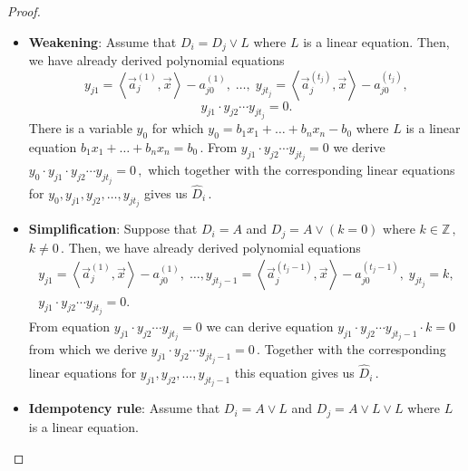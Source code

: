 \documentclass[11pt]{article}
\newcommand{\Z}{{\mathbb Z}}
\begin{document}
\begin{proof}
\begin{itemize}
 Then there is an equation $y_{i} = L_i$ from the set  $\{y_1 = L_1, y_2 = L_2, \ldots, y_t = L_t\}$ for which %
    $$
    L_{i} = \alpha \left(\left\langle \vec a_j^{(1)}, \vec x \right \rangle - a_{j 0}^{(1)}\right) + \beta \left(\left\langle \vec a_k^{(1)}, \vec x \right \rangle - a_{k 0}^{(1)}\right).
    $$
    Then we derive $y_{i} = \alpha y_{j 1} + \beta y_{k 1}$ and %
$y_{i} \cdot y_{j 2} \cdots y_{j t_j} \cdot y_{k 2} \cdots y_{k t_k} = 0\,,$ %
 which together with the corresponding linear equations for  $y_{i}, y_{j 2}, \ldots, y_{j t_j}, y_{k 2}, \ldots, y_{k t_k}$ give %
$\widehat{D}_i\,.$ %
    \item \textbf{Weakening}: Assume that $D_i = D_j \vee L$ where $L$ is a linear equation. Then, we have already derived polynomial equations 
    $$
    y_{j 1} = \left\langle \vec a_j^{(1)}, \vec x \right \rangle - a_{j 0}^{(1)}, \; \ldots, \; y_{j t_j} = \left\langle \vec a_j^{(t_j)}, \vec x \right \rangle - a_{j 0}^{(t_j)},
    $$
    $$
    y_{j 1} \cdot y_{j 2} \cdots y_{j t_j} = 0.
    $$
    There is a variable $y_0$ for which $y_0 = b_{1}x_1 + \ldots + b_n x_n - b_0$ where $L$ is a linear equation %
$b_{1}x_1 + \ldots + b_n x_n = b_0\,.$ %
 From $y_{j 1} \cdot y_{j 2} \cdots y_{j t_j} = 0$ we derive %
$y_0 \cdot y_{j 1} \cdot y_{j 2} \cdots y_{j t_j} = 0\,,$ %
 which together with the corresponding linear equations for  $y_{0}, y_{j 1}, y_{j 2}, \ldots, y_{j t_j}$ gives us %
$\widehat{D}_i\,.$ %
%
    \item \textbf{Simplification}: Suppose that $D_i = A$ and $D_j = A \vee (k = 0)$ where %
$k \in \Z\,,$ %
$k \neq 0\,.$ %
 Then, we have already derived polynomial equations
    \begin{align*}
    y_{j 1} = \left\langle \vec a_j^{(1)}, \vec x \right \rangle - a_{j 0}^{(1)}, \; \ldots, y_{j t_j - 1} =\left\langle \vec a_j^{(t_j - 1)}, \vec x \right \rangle - a_{j 0}^{(t_j - 1)}, \; y_{j t_j} = k, \\ %
	y_{j 1} \cdot y_{j 2} \cdots y_{j t_j} = 0.
    \end{align*}
    From equation $y_{j 1} \cdot y_{j 2} \cdots y_{j t_j} = 0$ we can derive equation $y_{j 1} \cdot y_{j 2} \cdots y_{j t_j - 1} \cdot k = 0$ from which we derive %
$y_{j 1} \cdot y_{j 2} \cdots y_{j t_j - 1} = 0\,.$ %
 Together with the corresponding linear equations for  $y_{j 1}, y_{j 2}, \ldots, y_{j t_j - 1}$ this equation gives us %
$\widehat{D}_i\,.$ %
    \item \textbf{Idempotency rule}: Assume that $D_i = A \vee L$ and $D_j = A \vee L \vee L$ where $L$ is a linear equation. %

\end{itemize}
\end{proof}
\end{document}
